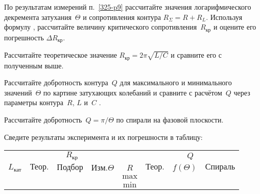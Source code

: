 \begin{lab:task}
\item По результатам измерений п.~\ref{325-p9} рассчитайте значения 
логарифмического декремента затухания~$\Theta$ и 
сопротивления контура $R_{\Sigma}=R+R_L$.
Используя формулу , рассчитайте величину 
критического сопротивления~$R_{кр}$ и оцените его погрешность $\Delta R_{кр}$.




%

\item Рассчитайте теоретическое значение $R_\text{кр} = 2\pi\sqrt{L / C}$
и сравните его с полученным выше.

\item Рассчитайте добротность контура~$Q$ для максимального и минимального
значений~$\Theta$ по картине затухающих колебаний и сравните с расчётом~$Q$
через параметры контура~$R$, $L$ и~$C$  .

\item Рассчитайте добротность~$Q=\pi/\Theta$ по спирали на фазовой плоскости.

\item Сведите результаты эксперимента и их погрешности в таблицу:
\begin{center}\small
\begin{tabular}{|c|c|c|c|c|c|c|c|}
\hline
& \multicolumn{3}{c|}{$R_{\text{кр}}$} &  & \multicolumn{3}{c|}{$Q$} \\
\cline{2-4}
\cline{6-8}
$L_{\text{кат}}$ & $\text{Теор.}$ & $\text{Подбор}$ & $\text{Изм.} \Theta$ & $R$ &
$\text{Теор.}$ & $f(\Theta)$ & $\text{Спираль}$  \\
\hline
& & & & $\text{max}$ & & &  \\
& & & & $\text{min}$ & & &  \\
\hline
\end{tabular}
\end{center}


\end{lab:task}
